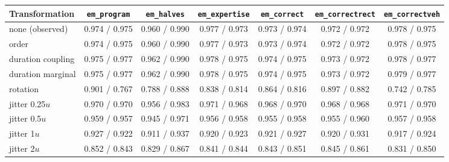\begin{tabular}{lcccccc}
\toprule
Transformation & \texttt{em\_program} & \texttt{em\_halves} & \texttt{em\_expertise} & \texttt{em\_correct} & \texttt{em\_correctrect} & \texttt{em\_correctveh} \\
\midrule
none (observed) & 0.974 / 0.975 & 0.960 / 0.990 & 0.977 / 0.973 & 0.973 / 0.974 & 0.972 / 0.972 & 0.978 / 0.975 \\
order & 0.974 / 0.975 & 0.960 / 0.990 & 0.977 / 0.973 & 0.973 / 0.974 & 0.972 / 0.972 & 0.978 / 0.975 \\
duration coupling & 0.975 / 0.977 & 0.962 / 0.990 & 0.978 / 0.975 & 0.974 / 0.975 & 0.973 / 0.972 & 0.978 / 0.977 \\
duration marginal & 0.975 / 0.977 & 0.962 / 0.990 & 0.978 / 0.975 & 0.974 / 0.975 & 0.973 / 0.972 & 0.979 / 0.977 \\
rotation & 0.901 / 0.767 & 0.788 / 0.888 & 0.838 / 0.814 & 0.864 / 0.816 & 0.897 / 0.882 & 0.742 / 0.785 \\
jitter 0.25$u$ & 0.970 / 0.970 & 0.956 / 0.983 & 0.971 / 0.968 & 0.968 / 0.970 & 0.968 / 0.968 & 0.971 / 0.970 \\
jitter 0.5$u$ & 0.959 / 0.957 & 0.945 / 0.971 & 0.956 / 0.958 & 0.955 / 0.958 & 0.955 / 0.960 & 0.957 / 0.958 \\
jitter 1$u$ & 0.927 / 0.922 & 0.911 / 0.937 & 0.920 / 0.923 & 0.921 / 0.927 & 0.920 / 0.931 & 0.917 / 0.924 \\
jitter 2$u$ & 0.852 / 0.843 & 0.829 / 0.867 & 0.841 / 0.844 & 0.843 / 0.851 & 0.845 / 0.861 & 0.831 / 0.850 \\
\bottomrule
\end{tabular}
